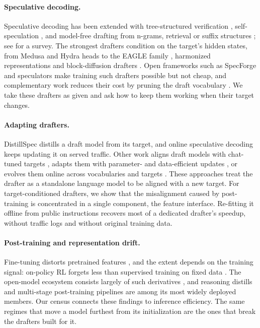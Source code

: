 \documentclass[11pt]{article}
\begin{document}
\paragraph{Speculative decoding.}
Speculative decoding \citep{leviathan2023speculative,chen2023accelerating} has been extended with tree-structured verification \citep{miao2024specinfer,chen2024sequoia}, self-speculation \citep{zhang2024draftverify}, and model-free drafting from n-grams, retrieval or suffix structures \citep{fu2024lookahead,he2024rest,saxena2023pld,oliaro2024suffix}; see \citet{xia2024survey} for a survey.
The strongest drafters condition on the target's hidden states, from Medusa and Hydra heads \citep{cai2024medusa,ankner2024hydra} to the EAGLE family \citep{li2024eagle,li2024eagle2,li2025eagle3}, harmonized representations \citep{zhang2025hass} and block-diffusion drafters \citep{chen2026dflash}.
Open frameworks such as SpecForge \citep{li2026specforge} and speculators \citep{redhat2025speculators} make training such drafters possible but not cheap, and complementary work reduces their cost by pruning the draft vocabulary \citep{zhao2025frspec,goel2025vocabtrim}.
We take these drafters as given and ask how to keep them working when their target changes.

\paragraph{Adapting drafters.}
DistillSpec \citep{zhou2024distillspec} distills a draft model from its target, and online speculative decoding \citep{liu2024online} keeps updating it on served traffic.
Other work aligns draft models with chat-tuned targets \citep{goel2024direct}, adapts them with parameter- and data-efficient updates \citep{lin2026eda}, or evolves them online across vocabularies and targets \citep{ramakrishnan2025omnidraft,zhang2026evospec}.
These approaches treat the drafter as a standalone language model to be aligned with a new target.
For target-conditioned drafters, we show that the misalignment caused by post-training is concentrated in a single component, the feature interface.
Re-fitting it offline from public instructions recovers most of a dedicated drafter's speedup, without traffic logs and without original training data.

\paragraph{Post-training and representation drift.}
Fine-tuning distorts pretrained features \citep{kumar2022finetuning}, and the extent depends on the training signal: on-policy RL forgets less than supervised training on fixed data \citep{shenfeld2026razor,chen2026retaining}.
The open-model ecosystem consists largely of such derivatives \citep{horwitz2025atlas}, and reasoning distills \citep{deepseek2025r1,bercovich2025nemotron} and multi-stage post-training pipelines \citep{lambert2024tulu3} are among its most widely deployed members.
Our census connects these findings to inference efficiency.
The same regimes that move a model furthest from its initialization are the ones that break the drafters built for it.
\end{document}
